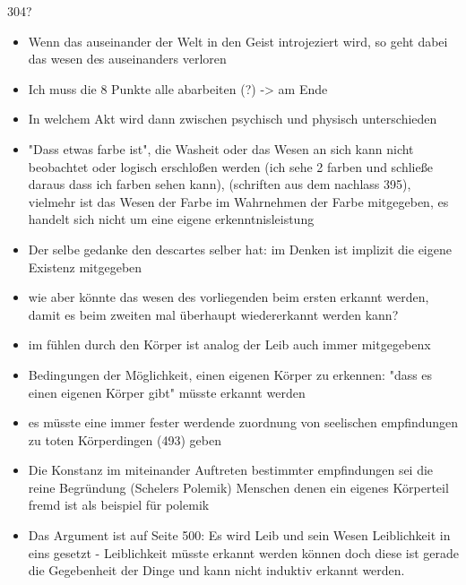 \documentclass[a4paper, 12pt]{article}
\begin{document}
\begin{onehalfspace}

304? 

\begin{itemize}
  \item Wenn das auseinander der Welt in den Geist introjeziert wird, so geht dabei das wesen des auseinanders verloren 
  \item Ich muss die 8 Punkte alle abarbeiten (?) -> am Ende
  \item In welchem Akt wird dann zwischen psychisch und physisch unterschieden
  \item "Dass etwas farbe ist", die Washeit oder das Wesen an sich kann nicht beobachtet oder logisch erschloßen werden (ich sehe 2 farben und schließe daraus dass ich farben sehen kann), (schriften aus dem nachlass 395), vielmehr ist das Wesen der Farbe im Wahrnehmen der Farbe mitgegeben, es handelt sich nicht um eine eigene erkenntnisleistung
  \item Der selbe gedanke den descartes selber hat: im Denken ist implizit die eigene Existenz mitgegeben
  \item wie aber könnte das wesen des vorliegenden beim ersten erkannt werden, damit es beim zweiten mal überhaupt wiedererkannt werden kann?
  \item im fühlen durch den Körper ist analog der Leib auch immer mitgegebenx
  \item Bedingungen der Möglichkeit, einen eigenen Körper zu erkennen: "dass es einen eigenen Körper gibt" müsste erkannt werden
  \item es müsste eine immer fester werdende zuordnung von seelischen empfindungen zu toten Körperdingen (493) geben
  \item Die Konstanz im miteinander Auftreten bestimmter empfindungen sei die reine Begründung (Schelers Polemik) Menschen denen ein eigenes Körperteil fremd ist als beispiel für polemik
  \item Das Argument ist auf Seite 500: Es wird Leib und sein Wesen Leiblichkeit in eins gesetzt - Leiblichkeit müsste erkannt werden können doch diese ist gerade die Gegebenheit der Dinge und kann nicht induktiv erkannt werden.
\end{itemize}



\end{onehalfspace}
\end{document}
